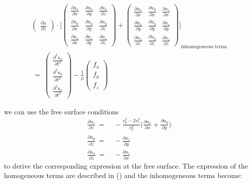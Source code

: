 \documentclass{article}
\begin{document}
\begin{align}
{\begin{pmatrix}
				\frac{\partial \mu}{\partial z}
			\end{pmatrix}
			\cdot  \Bigg[
			\begin{pmatrix}
				\frac{\partial u_{x}}{\partial x} & \frac{\partial u_{x}}{\partial y} & \frac{\partial u_{x}}{\partial z}\\
				\frac{\partial u_{y}}{\partial x} & \frac{\partial u_{y}}{\partial y} & \frac{\partial u_{y}}{\partial z}\\
				\frac{\partial u_{z}}{\partial x} & \frac{\partial u_{z}}{\partial y} & \frac{\partial u_{z}}{\partial z}
			\end{pmatrix}
			+
			\begin{pmatrix}
				\frac{\partial u_{x}}{\partial x} & \frac{\partial u_{y}}{\partial x} & \frac{\partial u_{z}}{\partial x}\\
				\frac{\partial u_{x}}{\partial y} & \frac{\partial u_{y}}{\partial y} & \frac{\partial u_{z}}{\partial y}\\
				\frac{\partial u_{x}}{\partial z} & \frac{\partial u_{y}}{\partial z} & \frac{\partial u_{z}}{\partial z}
			\end{pmatrix}
			\Bigg]}_\text{inhomogeneous terms} \\ \nonumber
		\: = \: 
		\begin{pmatrix}
			\frac{\partial^{2} u_{x}}{\partial t^{2}} \\
			\frac{\partial^{2} u_{y}}{\partial t^{2}} \\
			\frac{\partial^{2} u_{z}}{\partial t^{2}} 
		\end{pmatrix}
		- \frac{1}{\rho}
		\begin{pmatrix}
			f_{x}\\
			f_{y}\\
			f_{z}
		\end{pmatrix} %
		\label{eq4a_allterms}    
	\end{align} 

	we can use the free surface conditions 
	\begin{align}
		\frac{\partial u_{z}}{\partial z} \: =& \: - \frac{v_{p}^{2} - 2v_{s}^{2}}{v_{p}^{2}} \Big(\frac{\partial u_{x}}{\partial x} + \frac{\partial u_{y}}{\partial y}\Big)\\ 
		\frac{\partial u_{y}}{\partial z} \: =& \: - \frac{\partial u_{z}}{\partial y} \\
		\frac{\partial u_{x}}{\partial z} \: =& \: - \frac{\partial u_{z}}{\partial x}
	\end{align}\mbox{}
	to derive the corresponding expression at the free surface. The expression of the homogeneous terms are described in (\cite{curtis2002volumetric}) and the inhomogeneous terms become:
\end{document}
